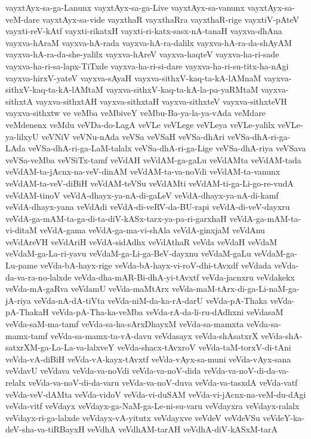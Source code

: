 {vayxtAyx-sa-ga-Lanunx
vayxtAyx-sa-ga-Live
vayxtAyx-sa-vanunx
vayxtAyx-sa-veM-dare
vayxtAyx-sa-vide
vayxthaR
vayxthaRra
vayxthaR-rige
vayxtiV-pAteV
vayxti-reV-kAtf
vayxti-rikatxH
vayxti-ri-katx-sasx-nA-tanaH
vayxva-dhAna
vayxva-hAraM
vayxva-hA-rada
vayxva-hA-ra-dalilx
vayxva-hA-ra-da-shAyAM
vayxva-hA-ra-da-she-yalilx
vayxva-hAreV
vayxva-haqteV
vayxva-ha-ri-sade
vayxva-ha-ri-sa-lapx-TiTxde
vayxva-ha-ri-si-dare
vayxva-ha-ri-su-titx-ha-nAgi
vayxva-hirxV-yateV
vayxva-sAyaH
vayxva-sithxV-kaq-ta-kA-lAMnaM
vayxva-sithxV-kaq-ta-kA-lAMtaM
vayxva-sithxV-kaq-ta-kA-la-pa-yaRMtaM
vayxva-sithxtA
vayxva-sithxtAH
vayxva-sithxtaH
vayxva-sithxteV
vayxva-sithxteVH
vayxva-sithxtw
ve
veMba
veMbiveY
veMbu-Ba-ya-la-ya-vAda
veMdare
veMdenenx
veMdu
veVDa-do-LagA
veVLe
veVLege
veVLeya
veVLe-yalilx
veVLe-ya-lilxyU
veVNiV
veVNu-nAda
veVSa
veVSaH
veVSa-dhAri
veVSa-dhA-ri-ga-LAda
veVSa-dhA-ri-ga-LaM-talalx
veVSa-dhA-ri-ga-Lige
veVSa-dhA-riya
veVSava
veVSa-veMba
veVSiTx-tamf
veVdAH
veVdAM-ga-gaLu
veVdAMta
veVdAM-tada
veVdAM-ta-jAcnx-na-veV-dinAM
veVdAM-ta-va-noVdi
veVdAM-ta-vanunx
veVdAM-ta-veV-diBiH
veVdAM-teVSu
veVdAMti
veVdAM-ti-ga-Li-go-re-vudA
veVdAM-tinoV
veVdA-dhayx-ya-nA-di-gaLeV
veVdA-dhayx-ya-nA-di-kamf
veVdA-dhayx-yana
veVdAdi
veVdA-di-veRV-da-BU-rapi
veVdA-di-veV-dayxru
veVdA-ga-mAM-ta-ga-di-ta-diV-kASx-tarx-ya-pa-ri-garxhaH
veVdA-ga-mAM-ta-vi-ditaM
veVdA-gama
veVdA-ga-ma-vi-shAla
veVdA-ginxjaM
veVdAnu
veVdAreVH
veVdAriH
veVdA-sidAdhx
veVdAthaR
veVda
veVdaH
veVdaM
veVdaM-ga-La-ri-yavu
veVdaM-ga-Li-ga-BeV-dayxnu
veVdaM-gaLu
veVdaM-ga-Lu-pame
veVda-bA-hayx-rige
veVda-bA-hayx-vi-roV-dhi-tAvxdf
veVdada
veVda-da-va-ra-no-lalxde
veVda-dha-mAR-Bi-dhA-yi-tAvxtf
veVda-jacnxru
veVdakekx
veVda-mA-gaRva
veVdamU
veVda-maMtArx
veVda-maM-tArx-di-ga-Li-naM-ga-jA-riya
veVda-nA-dA-tiVta
veVda-niM-da-ka-rA-darU
veVda-pA-Thaka
veVda-pA-ThakaH
veVda-pA-Tha-ka-veMba
veVda-rA-da-li-ru-dAdhxni
veVdasaM
veVda-saM-ma-tamf
veVda-sa-ha-sArxDhayxM
veVda-sa-mamxta
veVda-sa-mamx-tamf
veVda-sa-mamx-ta-vA-davu
veVdasayx
veVda-shAsatxrX
veVda-shA-satxrXM-ga-La-La-va-lalxveY
veVda-shacx-tAvxroV
veVda-taM-torxV-di-tAni
veVda-vA-diBiH
veVda-vA-kayx-tAvxtf
veVda-vAyx-sa-muni
veVda-vAyx-sana
veVdavU
veVdava
veVda-va-noVdi
veVda-va-noV-dida
veVda-va-noV-di-da-va-relalx
veVda-va-noV-di-da-varu
veVda-va-noV-duva
veVda-va-tasxdA
veVda-vatf
veVda-veV-dAMta
veVda-vidoV
veVda-vi-duSAM
veVda-vi-jAcnx-na-veM-du-dAgi
veVda-vitf
veVdayx
veVdayx-ga-NaM-ga-Le-ni-su-varu
veVdayxra
veVdayx-ralalx
veVdayx-ri-ga-lalxde
veVdayx-vA-yitutx
veVdayxve
veVdeV
veVdeVSu
veVdeY-ka-deV-sha-va-tiRBayxH
veVdhA
veVdhAM-tarAH
veVdhA-diV-kASxM-tarA
}
